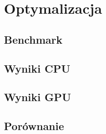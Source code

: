 \chapter{Optymalizacja}
\section{Benchmark}
\section{Wyniki CPU}
\section{Wyniki GPU}
\section{Porównanie}


